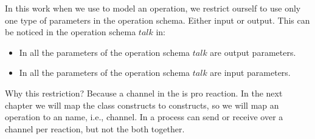 In this work when we use \oz{} to model an operation, we restrict ourself to use only one type of parameters in the operation schema. Either input or output. This can be noticed in the operation schema $talk$ in:
\begin{itemize}
\item In  all the parameters of the operation schema $talk$ are output parameters.
\item In   all the parameters of the operation schema $talk$ are input parameters.
\end{itemize}
Why this restriction? Because a channel in the \picalc{} is  pro reaction. In the next chapter we will map the \oz{} class constructs to  \picalc{} constructs, so we will map an \oz{} operation to an \picalc{} name, i.e., channel. In \picalc{} a process can send or receive over a channel per reaction, but not the both together.